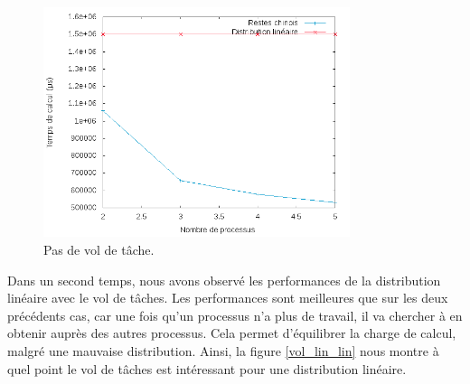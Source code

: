 \begin{figure}[H]
\centering
\includegraphics[width=0.8\textwidth]{comp_chinois_lin.png}
\caption{Pas de vol de tâche.}
\label{comp_chinois_lin}
\end{figure}

Dans un second temps, nous avons observé les performances de la distribution linéaire avec le vol de tâches. Les performances sont meilleures que sur les deux précédents cas, car une fois qu'un processus n'a plus de travail, il va chercher à en obtenir auprès des autres processus. Cela permet d'équilibrer la charge de calcul, malgré une mauvaise distribution. Ainsi, la figure \ref{vol_lin_lin} nous montre à quel point le vol de tâches est intéressant pour une distribution linéaire.

